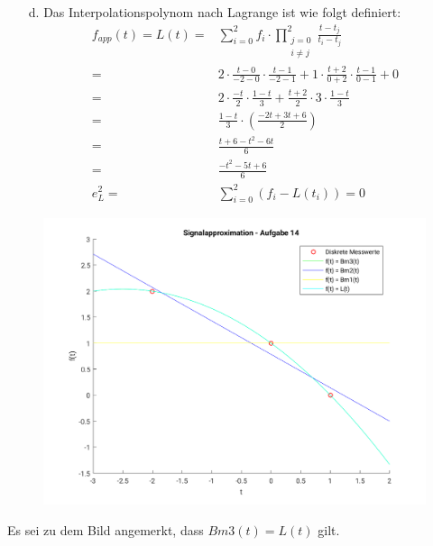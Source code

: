 \begin{itemize}
		\item[d.] Das Interpolationspolynom nach Lagrange ist wie folgt definiert:
		\begin{align*}
			f_{app}(t) = L(t)	=& \sum_{i=0}^2 f_i\cdot \prod_{\substack{j=0\\i\ne j}}^2\frac{t - t_j}{t_i-t_j}\\
								=& 2\cdot\frac{t-0}{-2-0}\cdot\frac{t-1}{-2-1} + 1\cdot \frac{t+2}{0+2}\cdot\frac{t-1}{0-1} + 0\\
								=& 2\cdot\frac{-t}{2}\cdot\frac{1-t}{3} + \frac{t+2}{2}\cdot3\cdot\frac{1-t}{3}\\
								=& \frac{1-t}{3}\cdot\left(\frac{-2t+3t+6}{2}\right)\\
								=& \frac{t+6-t^2-6t}{6}\\
								=& \frac{-t^2-5t+6}{6}\\
						e_L^2	=& \sum_{i=0}^2\left( f_i - L(t_i) \right)= 0
		\end{align*}


	\end{itemize}
	\begin{figure}
		\includegraphics[scale = 0.7]{A14_plot.png}
	\end{figure}
	Es sei zu dem Bild angemerkt, dass $Bm3(t) = L(t)$ gilt.
\newpage